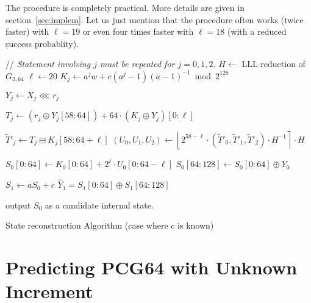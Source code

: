 \documentclass[submission,svgnames,journal=tosc]{iacrtrans}
\begin{document}
The procedure is completely practical. More details are given in
section~\ref{sec:implem}. Let us just mention that the procedure often works
(twice faster) with $\ell=19$ or even four times faster with $\ell = 18$ (with a
reduced success probablity).

\begin{algorithm}
\begin{algorithmic}[1]
  \State // \emph{Statement involving $j$ must be repeated for $j=0, 1, 2$.}
  \State $H \gets$ LLL reduction of $G_{3,64}$
  \State $\ell \gets 20$
   
    \State $K_j \gets a^j w + c (a^j - 1)(a-1)^{-1} \bmod 2^{128}$    
    
     
    
    \State $Y_j \gets X_j \lll r_j$ 
    
    \State $T_j \gets \left(r_j \oplus Y_j[58:64]\right) +  64 \cdot \left(K_j \oplus Y_j\right)[0:\ell]$  
    
    \State $\widetilde T'_j \gets T_j \boxminus K_j[58:64+\ell]$  
    \State $(U_0, U_1, U_2) \gets \left\lfloor 2^{58-\ell} \cdot (\widetilde T'_0, \widetilde T'_1, \widetilde T'_2) \cdot  H^{-1} \right\rceil \cdot H$ 

    \State $S_0[0:64] \gets  K_0[0:64] + 2^{\ell} \cdot U_0[0:64-\ell]$ 
    \State $S_0[64:128] \gets S_0[0:64] \oplus Y_0$ 
    
    \State $S_1 \gets a  S_0 + c$ 
    \State $\widehat{Y}_1 =  S_1[0:64] \oplus  S_1[64:128]$
    
     
    \State output $S_0$ as a candidate internal state.
    \EndIf
    \EndFor
    \EndFor
    \EndProcedure
  \end{algorithmic}
  \caption{State reconstruction Algorithm (case where $c$ is known)}
  \label{algo:known}
\end{algorithm}
  
\section{Predicting PCG64 with Unknown Increment}
\label{sec:Cunknown}
\end{document}
